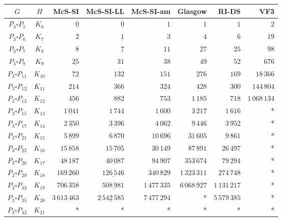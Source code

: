
\begin{tabular}{ccrrrrrr}
    \toprule
    {$G$} & {$H$} & {McS-SI} & {McS-SI-LL} & {McS-SI-am} & Glasgow & RI-DS & VF3\\ 
    \midrule

$P_3\square P_{5}$ & $K_{6}$ & $\underline{0}$ & $\underline{0}$ & $1$ & $1$ & $1$ & $2$\\
$P_3\square P_{6}$ & $K_{7}$ & $2$ & $\underline{1}$ & $3$ & $4$ & $6$ & $19$\\
$P_3\square P_{7}$ & $K_{8}$ & $8$ & $\underline{7}$ & $11$ & $27$ & $25$ & $98$\\
$P_3\square P_{8}$ & $K_{9}$ & $\underline{25}$ & $31$ & $38$ & $49$ & $52$ & $676$\\
$P_3\square P_{11}$ & $K_{10}$ & $\underline{72}$ & $132$ & $151$ & $276$ & $169$ & $18\,366$\\
$P_3\square P_{12}$ & $K_{11}$ & $\underline{214}$ & $366$ & $324$ & $428$ & $300$ & $144\,804$\\
$P_3\square P_{13}$ & $K_{12}$ & $\underline{456}$ & $882$ & $753$ & $1\,185$ & $718$ & $1\,068\,134$\\
$P_3\square P_{15}$ & $K_{13}$ & $\underline{1\,041}$ & $1\,744$ & $1\,600$ & $3\,217$ & $1\,616$ & *\\
$P_3\square P_{17}$ & $K_{14}$ & $\underline{2\,350}$ & $3\,396$ & $4\,062$ & $9\,446$ & $3\,952$ & *\\
$P_3\square P_{21}$ & $K_{15}$ & $\underline{5\,899}$ & $6\,870$ & $10\,696$ & $31\,605$ & $9\,861$ & *\\
$P_3\square P_{22}$ & $K_{16}$ & $15\,858$ & $\underline{15\,705}$ & $30\,149$ & $87\,891$ & $26\,497$ & *\\
$P_3\square P_{26}$ & $K_{17}$ & $48\,187$ & $\underline{40\,087}$ & $94\,907$ & $353\,674$ & $79\,294$ & *\\
$P_3\square P_{29}$ & $K_{18}$ & $169\,260$ & $\underline{126\,546}$ & $340\,829$ & $1\,323\,311$ & $274\,748$ & *\\
$P_3\square P_{33}$ & $K_{19}$ & $706\,358$ & $\underline{508\,981}$ & $1\,477\,335$ & $6\,068\,927$ & $1\,131\,217$ & *\\
$P_3\square P_{35}$ & $K_{20}$ & $3\,613\,463$ & $\underline{2\,542\,585}$ & $7\,477\,294$ & * & $5\,579\,385$ & *\\
$P_3\square P_{42}$ & $K_{21}$ & * & * & * & * & * & *\\

    \bottomrule
\end{tabular}

